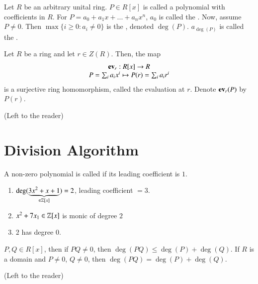 \documentclass[12pt, a4paper, twoside, openright, titlepage]{book}
\begin{document}
\begin{defn}{}{}
    Let $R$ be an arbitrary unital ring. $P \in R[x]$ is called a polynomial with coefficients in $R$. For $P = a_0+a_1x+...+a_nx^n$, $a_0$ is called the . Now, assume $P \neq 0$. Then $\max\{i\geq 0:a_i \neq0\}$ is the , denoted $\deg(P)$. $a_{\deg(P)}$ is called the .
\end{defn}

\begin{defn}{}{}
    Let $R$ be a ring and let $r \in Z(R)$. Then, the map \begin{equation}
        \begin{array}{c} \operatorname{\bf{ev}}_r:R[x]\rightarrow R \\ P = \sum_ia_ix^i \mapsto P(r) = \sum_ia_ir^i \end{array}
    \end{equation}
    is a surjective ring homomorphism, called the evaluation at $r$. Denote $\operatorname{\bf{ev}}_r(P)$ by $P(r)$.
    \begin{proof*}{}{}
        (Left to the reader)
    \end{proof*}
\end{defn}

\section{\textsection Division Algorithm}

\begin{defn}{}{}
    A non-zero polynomial is called  if its leading coefficient is $1$.
\end{defn}

\begin{eg}{}{}
    \leavevmode
    \begin{enumerate}
        \item $\deg(\underbrace{3x^2+x+1}_{\in\mathbb Z[x]}) = 2$, leading coefficient $= 3$.
        \item $x^2+7x_1 \in \mathbb Z[x]$ is monic of degree $2$
        \item $2$ has degree $0$.
    \end{enumerate}
\end{eg}

\begin{rmk}{}{}
    $P,Q \in R[x]$, then if $PQ \neq 0$, then $\deg(PQ) \leq \deg(P) + \deg(Q)$. If $R$ is a domain and $P \neq 0$, $Q \neq 0$, then $\deg(PQ) = \deg(P) + \deg(Q)$.
    \begin{proof*}{}{}
        (Left to the reader)
    \end{proof*}
\end{rmk}
\end{document}
